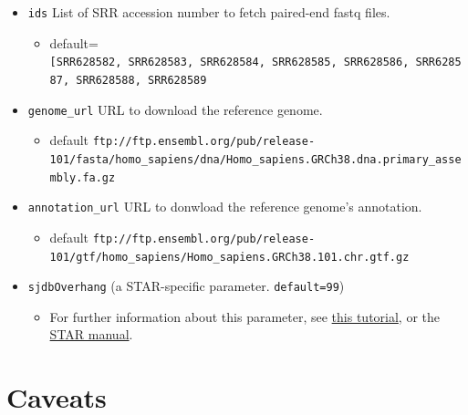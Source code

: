 \documentclass[
  openany]{book}
\providecommand{\tightlist}{%
  \setlength{\itemsep}{0pt}\setlength{\parskip}{0pt}}
\begin{document}
\begin{itemize}
\tightlist
\item
  \texttt{ids} List of SRR accession number to fetch paired-end fastq files.

  \begin{itemize}
  \tightlist
  \item
    default=\texttt{{[}\textquotesingle{}SRR628582\textquotesingle{},\ \textquotesingle{}SRR628583\textquotesingle{},\ \textquotesingle{}SRR628584\textquotesingle{},\ \textquotesingle{}SRR628585\textquotesingle{},\ \textquotesingle{}SRR628586\textquotesingle{},\ \textquotesingle{}SRR628587\textquotesingle{},\ \textquotesingle{}SRR628588\textquotesingle{},\ \textquotesingle{}SRR628589\textquotesingle{}{]}}
  \end{itemize}
\item
  \texttt{genome\_url} URL to download the reference genome.

  \begin{itemize}
  \tightlist
  \item
    default \texttt{ftp://ftp.ensembl.org/pub/release-101/fasta/homo\_sapiens/dna/Homo\_sapiens.GRCh38.dna.primary\_assembly.fa.gz}
  \end{itemize}
\item
  \texttt{annotation\_url} URL to donwload the reference genome's annotation.

  \begin{itemize}
  \tightlist
  \item
    default \texttt{ftp://ftp.ensembl.org/pub/release-101/gtf/homo\_sapiens/Homo\_sapiens.GRCh38.101.chr.gtf.gz}
  \end{itemize}
\item
  \texttt{sjdbOverhang} (a STAR-specific parameter. \texttt{default=99})

  \begin{itemize}
  \tightlist
  \item
    For further information about this parameter, see \href{https://sydney-informatics-hub.github.io/training-RNAseq/02-BuildAGenomeIndex/index.html}{this tutorial},
    or the \href{https://physiology.med.cornell.edu/faculty/skrabanek/lab/angsd/lecture_notes/STARmanual.pdf}{STAR manual}.
  \end{itemize}
\end{itemize}

\hypertarget{caveats}{%
\chapter{Caveats}\label{caveats}}
\end{document}
